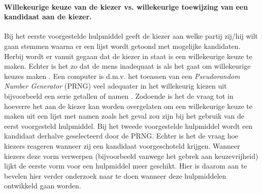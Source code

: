 \paragraph{Willekeurige keuze van de kiezer vs. willekeurige toewijzing van een kandidaat aan de kiezer.} Bij het eerste voorgestelde hulpmiddel geeft de kiezer aan welke partij zij/hij wilt gaan stemmen waarna er een lijst wordt getoond met mogelijke kandidaten. Herbij wordt er vanuit gegaan dat de kiezer in staat is een willekeurige keuze te maken. Echter is het zo dat de mens inadequaat is als het gaat om willekeurige keuzes maken \cite{schulz2012analysing,bar1991perception,neuringer1986can}. Een computer is d.m.v. het toeassen van een \textit{Pseudorandom Number Generator} (PRNG) veel adequater in het willekeurig kiezen uit bijvoorbeeld een serie getallen of namen \cite{lewis1969pseudo,RANDO99:online,matsumoto1998mersenne,rukhin2001statistical}. Zodoende is het de vraag tot in hoeverre het aan de kiezer kan worden overgelaten om een willekeurige keuze te maken uit een lijst met namen zoals het geval zou zijn bij het gebruik van de eerst voorgesteld hulpmiddel. Bij het tweede voorgestelde hulpmiddel wordt  een kandidaat derhalve geselecteerd door de PRNG. Echter is het de vraag hoe kiezers reageren wanneer zij een kandidaat voorgeschoteld krijgen. Wanneer kiezers deze vorm verwerpen (bijvoorbeeld vanwege het gebrek aan keuzevrijheid) lijkt de eerste vorm voor een hulpmiddel meer geschikt. Hier is daarom aan te bevelen hier verder onderzoek naar te doen wanneer deze hulpmiddelen ontwikkeld gaan worden.  

\newpage 